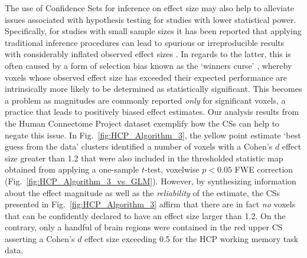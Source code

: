 The use of Confidence Sets for inference on effect size may also help to alleviate issues associated with hypothesis testing for studies with lower statistical power. Specifically, for studies with small sample sizes it has been reported that applying traditional inference procedures can lead to spurious or irreproducible results with considerably inflated observed effect sizes \citep{Poldrack2017-rr, Cremers2017-qk}. In regards to the latter, this is often caused by a form of selection bias known as the `winners curse' \citep{Reddan2017-rk, Button2013-ni}, whereby voxels whose observed effect size has exceeded their expected performance are intrinsically more likely to be determined as statistically significant. This becomes a problem as magnitudes are commonly reported \textit{only} for significant voxels, a practice that leads to positively biased effect estimates. Our analysis results from the Human Connectome Project dataset exemplify how the CSs can help to negate this issue. In Fig.\ \ref{fig:HCP_Algorithm_3}, the yellow point estimate `best guess from the data' clusters identified a number of voxels with a Cohen's $d$ effect size greater than 1.2 that were also included in the thresholded statistic map obtained from applying a one-sample $t$-test, voxelwise $p < 0.05$ FWE correction (Fig.\ \ref{fig:HCP_Algorithm_3_vs_GLM}). However, by synthesizing information about the effect magnitude as well as the \textit{reliability} of the estimate, the CSs presented in Fig.\ \ref{fig:HCP_Algorithm_3} affirm that there are in fact \textit{no} voxels that can be confidently declared to have an effect size larger than 1.2. On the contrary, only a handful of brain regions were contained in the red upper CS asserting a Cohen's $d$ effect size exceeding 0.5 for the HCP working memory task data.

